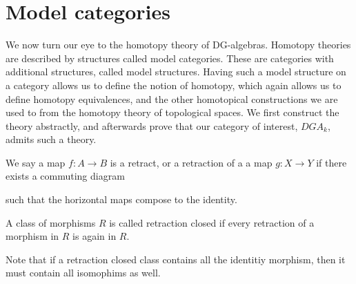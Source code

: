 
\section{Model categories}

We now turn our eye to the homotopy theory of DG-algebras. Homotopy theories are described by structures called model categories. These are categories with additional structures, called model structures. Having such a model structure on a category allows us to define the notion of homotopy, which again allows us to define homotopy equivalences, and the other homotopical constructions we are used to from the homotopy theory of topological spaces. We first construct the theory abstractly, and afterwards prove that our category of interest, $DGA_k$, admits such a theory. 

\begin{definition}[Retraction]
\label{def:retraction}
We say a map $f:A\longrightarrow B$ is a retract, or a retraction of a a map $g:X\longrightarrow Y$ if there exists a commuting diagram 
\begin{center}
\end{center}
such that the horizontal maps compose to the identity. 
\end{definition}

\begin{definition}
\label{def:retraction_closed}
A class of morphisms $R$ is called retraction closed if every retraction of a morphism in $R$ is again in $R$. 
\end{definition}

Note that if a retraction closed class contains all the identitiy morphism, then it must contain all isomophims as well. 



